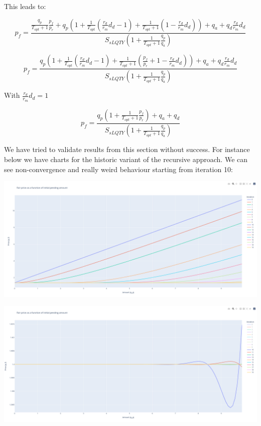 \documentclass{article}
\begin{document}
This leads to:

\[
p_{f} = \frac{ \frac{q_{p}}{T_{opt}+1}\frac{p_{f}}{p_{r}}+q_{p} \left(1+\frac{1}{T_{opt}}\left(\frac{r_{d}}{r_{m}}d_{d}-1\right)+ \frac{1}{T_{opt}+1}\left( 1 - \frac{r_{d}}{r_{m}}d_{d} \right)\right)+q_{a}+q_{d}\frac{r_{d}}{r_{m}}d_{d}}{S_{sLQTY}\left(1+  \frac{1}{T_{opt}+1}\frac{q_{p}}{q_{a}}\right)}
\]

\begin{equation}
p_{f} = \frac{q_{p} \left(1 + \frac{1}{T_{opt}}\left(\frac{r_{d}}{r_{m}}d_{d}-1\right)+ \frac{1}{T_{opt}+1}\left(\frac{p_{f}}{p_{r}} + 1 - \frac{r_{d}}{r_{m}}d_{d} \right)\right)+q_{a}+q_{d}\frac{r_{d}}{r_{m}}d_{d}}{S_{sLQTY}\left(1+  \frac{1}{T_{opt}+1}\frac{q_{p}}{q_{a}}\right)}
\end{equation}

With $\frac{r_{d}}{r_{m}}d_{d}=1$

\begin{equation}
p_{f} = \frac{q_{p} \left( 1+   \frac{1}{T_{opt}+1}\frac{p_{f}}{p_{r}} \right)+q_{a}+q_{d}}{S_{sLQTY}\left(1+  \frac{1}{T_{opt}+1}\frac{q_{p}}{q_{a}}\right)}
\end{equation}

We have tried to validate results from this section without success. For instance below we have charts for the historic variant of the recursive approach. We can see non-convergence and really weird behaviour starting from iteration 10:

\includegraphics[width=\linewidth]{./ChickenBonds_Whitepaper_recursive_price_1.png}

\includegraphics[width=\linewidth]{./ChickenBonds_Whitepaper_recursive_price_2.png}
\end{document}

